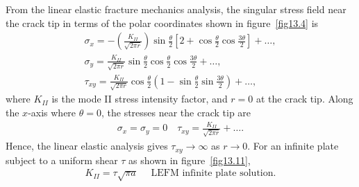 \documentclass{AeroStructure-ERJohnson}
\begin{document}
\vspace*{5pt}
\pagebreak

From the linear elastic fracture mechanics analysis, the singular stress field near the crack tip in terms of the polar coordinates shown in figure~\ref{fig13.4} is
\begin{gather}
\sigma_{x}=-\left(\frac{K_{I I}}{\sqrt{2 \pi r}}\right) \sin \frac{\theta}{2}\left[2+\cos \frac{\theta}{2} \cos \frac{3 \theta}{2}\right]+\ldots, \label{eq13.16} \\
\sigma_{y}=\frac{K_{I I}}{\sqrt{2 \pi r}} \sin \frac{\theta}{2} \cos \frac{\theta}{2} \cos \frac{3 \theta}{2}+\ldots, \label{eq13.17}
\\
\tau_{x y}=\frac{K_{I I}}{\sqrt{2 \pi r}} \cos \frac{\theta}{2}\left(1-\sin \frac{\theta}{2} \sin \frac{3 \theta}{2}\right)+\ldots, \label{eq13.18}
\end{gather}
where $K_{II}$ is the mode II stress intensity factor, and $r=0$ at the crack tip. Along the $x$-axis where $\theta=0$, the stresses near the crack tip are\vspace*{-0.6pc}
\begin{align}\label{eq13.19}
\sigma_{x}=\sigma_{y}=0 \quad \tau_{x y}=\frac{K_{I I}}{\sqrt{2 \pi r}}+\ldots.
\end{align}
Hence, the linear elastic analysis gives $\tau_{x y} \rightarrow \infty$ as $r \rightarrow 0$. For an infinite plate subject to a uniform shear $\tau$ as shown in figure~\ref{fig13.11},
\begin{align}\label{eq13.20}
K_{I I}=\tau \sqrt{\pi a}\quad \textrm{ LEFM infinite plate solution.}
\end{align}
\end{document}
